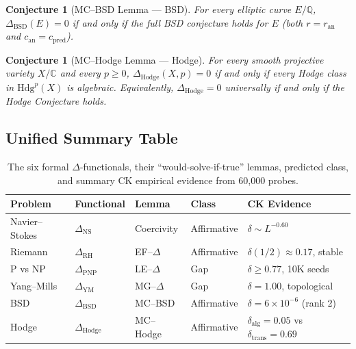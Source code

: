 \documentclass[11pt]{article}
\newtheorem{conjecture}[theorem]{Conjecture}
\begin{document}
\begin{conjecture}[MC--BSD Lemma --- BSD]
\label{conj:bsd}
For every elliptic curve $E / \mathbb{Q}$,
$\Delta_{\mathrm{BSD}}(E) = 0$ if and only if the full BSD
conjecture holds for $E$ (both $r = r_{\mathrm{an}}$ and
$c_{\mathrm{an}} = c_{\mathrm{pred}}$).
\end{conjecture}

\begin{conjecture}[MC--Hodge Lemma --- Hodge]
\label{conj:hodge}
For every smooth projective variety $X / \mathbb{C}$ and every
$p \geq 0$, $\Delta_{\mathrm{Hodge}}(X, p) = 0$ if and only if
every Hodge class in $\mathrm{Hdg}^p(X)$ is algebraic.
Equivalently, $\Delta_{\mathrm{Hodge}} = 0$ universally if and
only if the Hodge Conjecture holds.
\end{conjecture}

\subsection{Unified Summary Table}
\label{subsec:delta-table}

\begin{table}[h!]
\centering
\small
\begin{tabular}{@{}lllll@{}}
\toprule
\textbf{Problem} & \textbf{Functional} & \textbf{Lemma} & \textbf{Class} & \textbf{CK Evidence} \\
\midrule
Navier--Stokes & $\Delta_{\mathrm{NS}}$ & Coercivity & Affirmative & $\delta \sim L^{-0.60}$ \\
Riemann & $\Delta_{\mathrm{RH}}$ & EF--$\Delta$ & Affirmative & $\delta(1/2) \approx 0.17$, stable \\
P vs NP & $\Delta_{\mathrm{PNP}}$ & LE--$\Delta$ & Gap & $\delta \geq 0.77$, 10K seeds \\
Yang--Mills & $\Delta_{\mathrm{YM}}$ & MG--$\Delta$ & Gap & $\delta = 1.00$, topological \\
BSD & $\Delta_{\mathrm{BSD}}$ & MC--BSD & Affirmative & $\delta = 6 \times 10^{-6}$ (rank 2) \\
Hodge & $\Delta_{\mathrm{Hodge}}$ & MC--Hodge & Affirmative & $\delta_{\mathrm{alg}} = 0.05$ vs $\delta_{\mathrm{trans}} = 0.69$ \\
\bottomrule
\end{tabular}
\caption{The six formal $\Delta$-functionals, their ``would-solve-if-true'' lemmas,
predicted class, and summary CK empirical evidence from 60,000 probes.}
\label{tab:unified-deltas}
\end{table}
\end{document}
